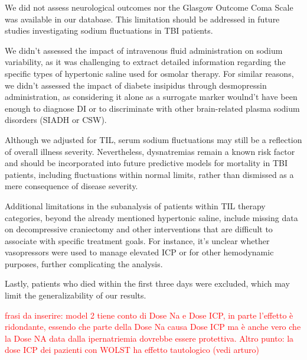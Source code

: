 We did not assess neurological outcomes nor the Glasgow Outcome Coma Scale was available in our database. This limitation should be addressed in future studies investigating sodium fluctuations in TBI patients.

We didn't assessed the impact of intravenous fluid administration on sodium variability, as it was challenging to extract detailed information regarding the specific types of hypertonic saline\cite{holdenHypertonicSalineUse2023a} used for osmolar therapy.
For similar reasons, we didn't assessed the impact of diabete insipidus through desmopressin administration, as considering it alone as a surrogate marker woulnd't have been enough to diagnose DI or to discriminate with other brain-related plasma sodium disorders (SIADH or CSW). 

Although we adjusted for TIL, serum sodium fluctuations may still be a reflection of overall illness severity. Nevertheless, dysnatremias remain a known risk factor and should be incorporated into future predictive models for mortality in TBI patients, including fluctuations within normal limits, rather than dismissed as a mere consequence of disease severity.

Additional limitations in the subanalysis of patients within TIL therapy categories, beyond the already mentioned hypertonic saline, include missing data on decompressive craniectomy\cite{kimRecentUpdatesControversies2023a} and other interventions that are difficult to associate with specific treatment goals. For instance, it’s unclear whether vasopressors were used to manage elevated ICP or for other hemodynamic purposes, further complicating the analysis.

Lastly, patients who died within the first three days were excluded, which may limit the generalizability of our results.

\textcolor{red}{frasi da inserire: model 2 tiene conto di Dose Na e Dose ICP, in parte l'effetto è ridondante, essendo che parte della Dose Na causa Dose ICP ma è anche vero che la Dose NA data dalla ipernatriemia dovrebbe essere protettiva. Altro punto: la dose ICP dei pazienti con WOLST ha effetto tautologico (vedi arturo)}


